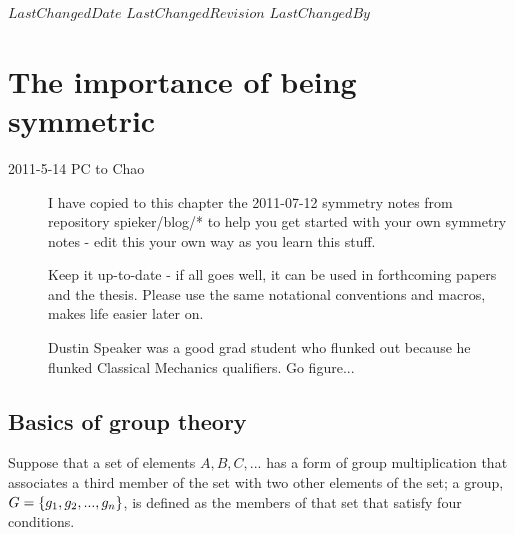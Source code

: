 \ifsvnmulti
{}
{$LastChangedDate$}
{$LastChangedRevision$} {$LastChangedBy$}
\fi


\chapter{The importance of being symmetric}
\label{chap:symms}

\begin{description}

\item[2011-5-14 PC to Chao]
I have copied to this chapter the 2011-07-12 symmetry notes from
repository spieker/blog/* to help you get started with your own symmetry
notes - edit this your own way as you learn this stuff.

Keep it up-to-date - if all goes well, it can be used in forthcoming
papers and
{the thesis}. Please use the same notational conventions and
macros, makes life easier later on.

Dustin Speaker was a good grad student who flunked out because he flunked
Classical Mechanics qualifiers. Go figure...

\end{description}


\section{Basics of group theory}


Suppose that a set of elements $A,B,C,...$ has a form of group
multiplication that associates a third member of the set with
two other elements of the set; a group, $G =
\{g_1,g_2,...,g_n\}$,
is defined as the members of that set that
satisfy four conditions.

